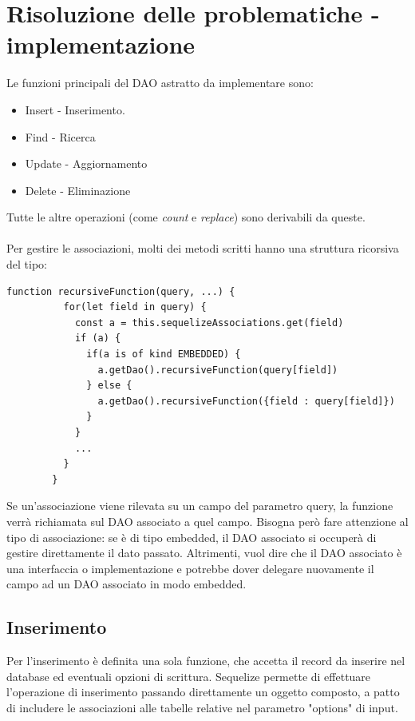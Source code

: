 \documentclass[a4paper, 12pt]{report}
\begin{document}
    \section{Risoluzione delle problematiche - implementazione}
      Le funzioni principali del DAO astratto da implementare sono:
      \begin{itemize}
        \item Insert - Inserimento.
        \item Find   - Ricerca
        \item Update - Aggiornamento
        \item Delete - Eliminazione
      \end{itemize}
      Tutte le altre operazioni (come \emph{count} e \emph{replace}) sono derivabili da queste.
      \paragraph*{}
      Per gestire le associazioni, molti dei metodi scritti hanno una struttura ricorsiva del tipo:
      \begin{Verbatim}[samepage=true]
        function recursiveFunction(query, ...) {
          for(let field in query) {
            const a = this.sequelizeAssociations.get(field)
            if (a) {
              if(a is of kind EMBEDDED) {
                a.getDao().recursiveFunction(query[field])
              } else {
                a.getDao().recursiveFunction({field : query[field]})
              }
            }
            ...
          }
        }
      \end{Verbatim}
      Se un'associazione viene rilevata su un campo del parametro query, la funzione verrà richiamata sul DAO associato a quel campo. 
      Bisogna però fare attenzione al tipo di associazione: se è di tipo embedded, il DAO associato si occuperà di gestire direttamente il dato passato. Altrimenti, vuol dire che il DAO associato è una interfaccia o implementazione e potrebbe dover
      delegare nuovamente il campo ad un DAO associato in modo embedded.
    \newpage
    \subsection{Inserimento}
      Per l'inserimento è definita una sola funzione, che accetta il record da inserire nel database ed eventuali opzioni di scrittura.
      Sequelize permette di effettuare l'operazione di inserimento passando direttamente un oggetto composto, a patto di includere le associazioni alle tabelle relative
      nel parametro "options" di input.
\end{document}
